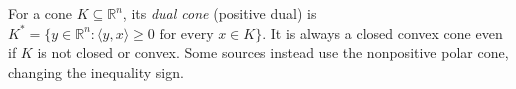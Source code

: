 
For a cone $K\subseteq\mathbb R^n$, its \emph{dual cone} (positive dual) is $K^*=\{y\in\mathbb R^n:\langle y,x\rangle\ge0\text{ for every }x\in K\}$. It is always a closed convex cone even if $K$ is not closed or convex. Some sources instead use the nonpositive polar cone, changing the inequality sign.
